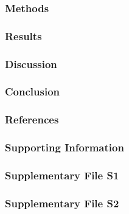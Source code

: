 \documentclass[12pt,portrait]{article}
\begin{document}
\hypertarget{methods}{%
\subsubsection{Methods}\label{methods}}

\hypertarget{results}{%
\subsubsection{Results}\label{results}}

\hypertarget{discussion}{%
\subsubsection{Discussion}\label{discussion}}

\hypertarget{conclusion}{%
\subsubsection{Conclusion}\label{conclusion}}

\clearpage
\singlespacing

\hypertarget{references}{%
\subsubsection{References}\label{references}}

\setlength{\parindent}{-0.2in}
\setlength{\leftskip}{0.2in}
\setlength{\parskip}{8pt}

\hypertarget{refs}{}

\doublespacing
\setlength{\parindent}{0.2in}

\hypertarget{supporting-information}{%
\subsubsection{Supporting Information}\label{supporting-information}}

\hypertarget{supplementary-file-s1}{%
\subsubsection{Supplementary File S1}\label{supplementary-file-s1}}

\hypertarget{supplementary-file-s2}{%
\subsubsection{Supplementary File S2}\label{supplementary-file-s2}}
\end{document}

